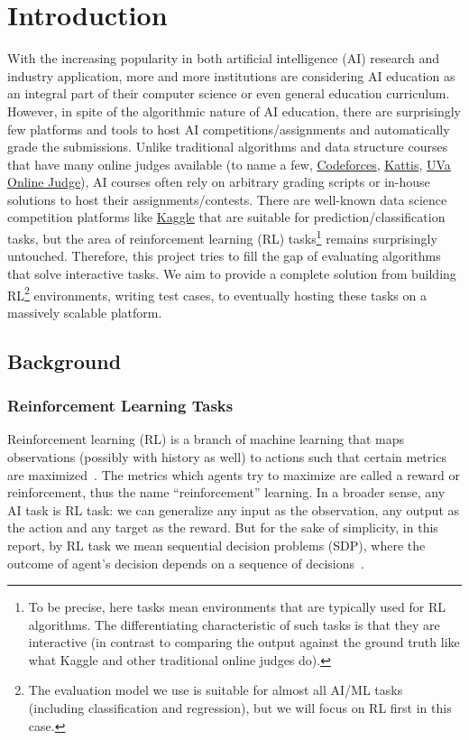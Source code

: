 \chapter{Introduction}

With the increasing popularity in both artificial intelligence (AI) research and industry application, more and more institutions are considering AI education as an integral part of their computer science or even general education curriculum. However, in spite of the algorithmic nature of AI education, there are surprisingly few platforms and tools to host AI competitions/assignments and automatically grade the submissions. Unlike traditional algorithms and data structure courses that have many online judges available (to name a few, \href{https://codeforces.com/}{Codeforces}, \href{https://open.kattis.com/}{Kattis}, \href{https://onlinejudge.org/}{UVa Online Judge}), AI courses often rely on arbitrary grading scripts or in-house solutions to host their assignments/contests. There are well-known data science competition platforms like \href{https://www.kaggle.com/}{Kaggle} that are suitable for prediction/classification tasks, but the area of reinforcement learning (RL) tasks\footnote{To be precise, here tasks mean environments that are typically used for RL algorithms. The differentiating characteristic of such tasks is that they are interactive (in contrast to comparing the output against the ground truth like what Kaggle and other traditional online judges do).} remains surprisingly untouched. Therefore, this project tries to fill the gap of evaluating algorithms that solve interactive tasks. We aim to provide a complete solution from building RL\footnote{The evaluation model we use is suitable for almost all AI/ML tasks (including classification and regression), but we will focus on RL first in this case.} environments, writing test cases, to eventually hosting these tasks on a massively scalable platform.

\section{Background}
\subsection{Reinforcement Learning Tasks}
Reinforcement learning (RL) is a branch of machine learning that maps observations (possibly with history as well) to actions such that certain metrics are maximized~\parencite{sutton-barto}. The metrics which agents try to maximize are called a reward or reinforcement, thus the name “reinforcement” learning. In a broader sense, any AI task is RL task: we can generalize any input as the observation, any output as the action and any target as the reward. But for the sake of simplicity, in this report, by RL task we mean sequential decision problems (SDP), where the outcome of agent’s decision depends on a sequence of decisions~\parencite{russell}.

